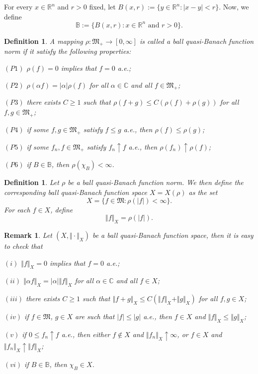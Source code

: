 \documentclass[oneside,10pt]{article}
\newtheorem{definition}[theorem]{Definition}
\newtheorem{remark}[theorem]{Remark}
\begin{document}
For every $x \in \mathbb{R}^n$ and $r > 0$ fixed, let $B(x,r) := \{ y \in \mathbb{R}^n: |x-y| < r \}$. Now, we define
\[
\mathbb{B} := \{ B(x,r) : x \in \mathbb{R}^n \,\, \text{and} \,\, r > 0 \}.
\]

\begin{definition}
A mapping $\rho : \mathfrak{M}_{+} \to [0, \infty]$ is called a ball quasi-Banach function norm if it satisfy the following properties:

$(P1)$ $\rho(f) = 0$ implies that $f = 0$ a.e.; 

$(P2)$ $\rho(\alpha f) = |\alpha| \rho(f)$ for all $\alpha \in \mathbb{C}$ and all $f \in \mathfrak{M}_{+}$;

$(P3)$ there exists $C \geq 1$ such that $\rho(f+g) \leq C (\rho(f) + \rho(g))$ for all $f, g \in \mathfrak{M}_{+}$;

$(P4)$ if some $f, g \in \mathfrak{M}_{+}$ satisfy $f \leq g$ a.e., then $\rho(f) \leq \rho(g)$;

$(P5)$ if some $f_n, f \in \mathfrak{M}_{+}$ satisfy $f_n \uparrow f$ a.e., then $\rho(f_n) \uparrow \rho(f)$;

$(P6)$ if $B \in \mathbb{B}$, then $\rho(\chi_B) < \infty$.
\end{definition}

\begin{definition}
Let $\rho$ be a ball quasi-Banach function norm. We then define the corresponding ball quasi-Banach function space $X = X(\rho)$ as the set
\[
X = \{ f \in \mathfrak{M} : \rho(|f|) < \infty \}.
\]
For each $f \in X$, define
\[
\Vert f \Vert_X = \rho(|f|).
\]
\end{definition}

\begin{remark} \label{prop X}
Let $(X, \Vert \cdot \Vert_X)$ be a ball quasi-Banach function space, then it is easy to check that

$(i)$ $\Vert f \Vert_X = 0$ implies that $f = 0$ a.e.;

$(ii)$ $\Vert \alpha f \Vert_X = |\alpha| \Vert f \Vert_X$ for all $\alpha \in \mathbb{C}$ and all $f \in X$;

$(iii)$ there exists $C \geq 1$ such that $\Vert f+g \Vert_X \leq C (\Vert f \Vert_X + \Vert g \Vert_X)$ for all $f, g \in X$;

$(iv)$ if $f \in \mathfrak{M}$, $g \in X$ are such that $|f| \leq |g|$ a.e., then $f \in X$ and $\Vert f \Vert_X \leq \Vert g \Vert_X$;

$(v)$ if $0 \leq f_n \uparrow f$ a.e., then either $f \notin X$ and $\Vert f_n \Vert_X \uparrow \infty$, or $f \in X$ and 
$\Vert f_n \Vert_X \uparrow \Vert f \Vert_X$;

$(vi)$ if $B \in \mathbb{B}$, then $\chi_B \in X$.
\end{remark}
\end{document}
